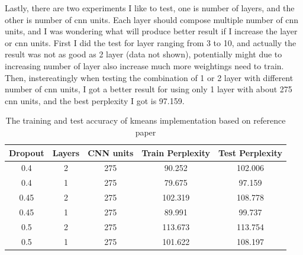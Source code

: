 \documentclass{article}
\begin{document}
Lastly, there are two experiments I like to test, one is number of layers, and the other is number of cnn units. Each layer should compose multiple number of cnn units, and I was wondering what will produce better result if I increase the layer or cnn units. First I did the test for layer ranging from 3 to 10, and actually the result was not as good as 2 layer (data not shown), potentially might due to increasing number of layer also increase much more weightings need to train. Then, instereatingly when testing the combination of 1 or 2 layer with different number of cnn units, I got a better result for using only 1 layer with about 275 cnn units, and the best perplexity I got is 97.159.

\begin{table}[h]
\begin{center}
    \begin{tabular}{| c | c | c | c | c |}
    \hline
    Dropout & Layers & CNN units & Train Perplexity & Test Perplexity\\ \hline
    0.4 & 2 & 275 & 90.252 & 102.006 \\ \hline
    0.4 & 1 & 275 & 79.675 & 97.159 \\ \hline
    0.45 & 2 & 275 & 102.319 & 108.778 \\ \hline
    0.45 & 1 & 275 & 89.991 & 99.737 \\ \hline
    0.5 & 2 & 275 & 113.673 & 113.754 \\ \hline
    0.5 & 1 & 275 & 101.622 & 108.197 \\ \hline
    \end{tabular}
\end{center}
\caption{The training and test accuracy of kmeans implementation based on reference paper}
\end{table}
\end{document}
